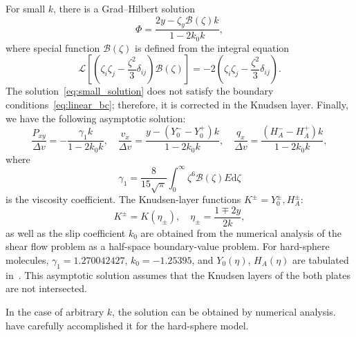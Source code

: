 \documentclass[review]{elsarticle}
\newcommand{\dd}{\mathrm{d}}
\begin{document}
For small \(k\), there is a Grad--Hilbert solution~\citep[see e.g.][]{Ohwada1990, Sone2007}
\begin{equation}\label{eq:small_solution}
    \Phi = \frac{2y - \zeta_y \mathcal{B}(\zeta) k}{1-2k_0k},
\end{equation}
where special function \(\mathcal{B}(\zeta)\) is defined from the integral equation
\begin{equation}\label{eq:transport_B}
    \mathcal{L}\left[\left(\zeta_i\zeta_j-\frac{\zeta^2}3\delta_{ij}\right) \mathcal{B}(\zeta)\right]
        = -2\left(\zeta_i\zeta_j-\frac{\zeta^2}3\delta_{ij}\right).
\end{equation}
The solution~\eqref{eq:small_solution} does not satisfy the boundary conditions~\eqref{eq:linear_bc};
therefore, it is corrected in the Knudsen layer. Finally, we have the following asymptotic solution:
\begin{equation}\label{eq:small_macro}
    \frac{P_{xy}}{\Delta{v}} = - \frac{\gamma_1 k}{1-2k_0k}, \quad
    \frac{v_x}{\Delta{v}} = \frac{y - (Y_0^--Y_0^+)k}{1-2k_0k}, \quad
    \frac{q_x}{\Delta{v}} = \frac{(H_A^--H_A^+)k}{1-2k_0k},
\end{equation}
where
\begin{equation}\label{eq:gamma_1}
    \gamma_1 = \frac{8}{15\sqrt{\pi}}\int_0^\infty \zeta^6 \mathcal{B}(\zeta)E\dd\zeta
\end{equation}
is the viscosity coefficient.
The Knudsen-layer functions \(K^\pm = Y_0^\pm, H_A^\pm\):
\begin{equation}\label{eq:linear_knudsen_functions}
     K^\pm = K(\eta_\pm), \quad \eta_\pm = \frac{1 \mp 2y}{2k},
\end{equation}
as well as the slip coefficient \(k_0\) are obtained from the numerical analysis
of the shear flow problem as a half-space boundary-value problem.
For hard-sphere molecules, \(\gamma_1 = 1.270042427\), \(k_0 = -1.25395\),
and \(Y_0(\eta)\), \(H_A(\eta)\) are tabulated in~\citet{Ohwada1989creep, Sone2002, Sone2007, Takata2015}.
This asymptotic solution assumes that the Knudsen layers of the both plates are not intersected.

In the case of arbitrary \(k\), the solution can be obtained by numerical analysis.
\citet{Ohwada1990} have carefully accomplished it for the hard-sphere model.
\end{document}
